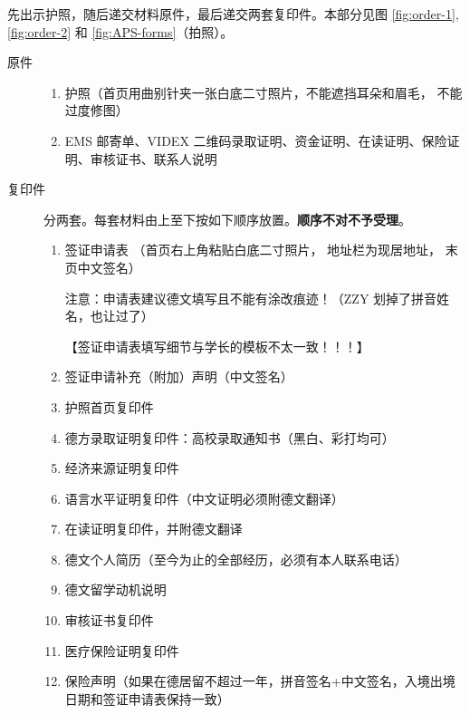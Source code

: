 \documentclass[final]{book}
\begin{document}
先出示护照，随后递交材料原件，最后递交两套复印件。本部分见图 \ref{fig:order-1}, \ref{fig:order-2} 和 \ref{fig:APS-forms}（拍照）。
\begin{description}
  \item[原件]
  \begin{enumerate}
    \item 护照（首页用曲别针夹一张白底二寸照片，不能遮挡耳朵和眉毛， 不能过度修图） 
    \item EMS 邮寄单、VIDEX 二维码录取证明、资金证明、在读证明、保险证明、审核证书、联系人说明
  \end{enumerate} 
  \item[复印件] 分两套。每套材料由上至下按如下顺序放置。\textbf{\color{red}顺序不对不予受理}。 
  \begin{enumerate}
    \item 签证申请表 （首页右上角粘贴白底二寸照片， 地址栏为现居地址， 末页中文签名） 

    注意：申请表建议德文填写且不能有涂改痕迹！（ZZY 划掉了拼音姓名，也让过了） 
    
    【签证申请表填写细节与学长的模板不太一致！！！】 
    
    \item 签证申请补充（附加）声明（中文签名） 
    
    \item 护照首页复印件 
    
    \item 德方录取证明复印件：高校录取通知书（黑白、彩打均可）
    
    \item 经济来源证明复印件 
    
    \item 语言水平证明复印件（中文证明必须附德文翻译） 
    
    \item 在读证明复印件，并附德文翻译 
    
    \item 德文个人简历（至今为止的全部经历，必须有本人联系电话） 
    
    \item 德文留学动机说明 
    
    \item 审核证书复印件 
    
    \item 医疗保险证明复印件 
    
    \item 保险声明（如果在德居留不超过一年，拼音签名+中文签名，入境出境日期和签证申请表保持一致）
  \end{enumerate} 
\end{description} 
\end{document}
